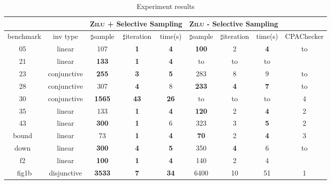 \begin{table}[t]
\scriptsize
\centering
\caption{Experiment results}
\begin{tabular}{l c | c c c | c c c | c | }
\cline{3-9}
& &\multicolumn{3}{|c|}{\textsc{Zilu} + Selective Sampling}&\multicolumn{3}{c|}{\textsc{Zilu} - Selective Sampling} & \\
\hline
\multicolumn{1}{|c|}{benchmark}&\multicolumn{1}{|c|}{inv type}& $\sharp$sample & $\sharp$iteration & time(s) & $\sharp$sample & $\sharp$iteration &time(s) & CPAChecker \\
\hline
\multicolumn{1}{|c|}{05~\cite{isil2013inductive}}				&linear 			& 107 & \textbf{1} &\textbf{4}	& \textbf{100} & 2 & \textbf{4} & to \\
\multicolumn{1}{|c|}{21~\cite{isil2013inductive}}				&linear 			& \textbf{133} & \textbf{1} & \textbf{4} & to & to & to & \ding{55} \\
\multicolumn{1}{|c|}{23~\cite{isil2013inductive}}				&conjunctive		& \textbf{255} & \textbf{3} & \textbf{5}	&  283 & 8 & 9 & to \\
\multicolumn{1}{|c|}{28~\cite{isil2013inductive}}				&conjunctive		& 307 & \textbf{4} & 8	& \textbf{233} & \textbf{4} & \textbf{7} & to \\
\multicolumn{1}{|c|}{30~\cite{isil2013inductive}}				&conjunctive		& \textbf{1565} & \textbf{43} & \textbf{26} & to & to & to & 4 \\
\multicolumn{1}{|c|}{35~\cite{isil2013inductive}}				&linear 			& 133 & \textbf{1} &\textbf{4}	& \textbf{120} & 2 & \textbf{4} & 2 \\
\multicolumn{1}{|c|}{43~\cite{isil2013inductive}}				&linear 			& \textbf{300} & \textbf{1} & 6	& 323 & 3 & \textbf{5} & 2 \\
\multicolumn{1}{|c|}{bound~\cite{isil2013inductive}}			&linear 			& 73 & \textbf{1} & \textbf{4} & \textbf{70} & 2 & \textbf{4} & 3 \\
\multicolumn{1}{|c|}{down~\cite{gupta2009invgen}}				&linear 			& \textbf{300} & \textbf{4} &\textbf{5}	& 350 & \textbf{4} & 6 & to \\
\multicolumn{1}{|c|}{f2~\cite{zilu:repo}}						&linear 			& \textbf{100} & \textbf{1} &\textbf{4}	& 140 & 2 & 4 & \ding{55} \\
\multicolumn{1}{|c|}{fig1b}			&disjunctive	& \textbf{3533} & \textbf{7} & \textbf{34} & 6400 & 10 & 51 & 1 \\

\end{tabular}
\end{table}
